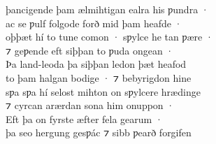 \documentclass[10pt]{book}
\begin{document}
\begin{center}
{þancigende þam \ae{}lmihtigan ealra his ƿundra · \\
ac se ƿulf folgode forð mid þam heafde · \\
oþþ\ae{}t h\'i to tune comon · sƿylce he tan ƿ\ae{}re · \\
⁊ geƿende eft siþþan to ƿuda ongean · \\
Þa land-leoda þa siþþan ledon þ\ae{}t heafod \\
to þam halgan bodige · ⁊ bebyrigdon hine \\
sƿa sƿa h\'i selost mihton on sƿylcere hr\ae{}dinge \\
⁊ cyrcan ar\ae{}rdan sona him onuppon · \\
Eft þa on fyrste \ae{}fter fela gearum · \\
þa seo hergung gesƿ\'ac ⁊ sibb ƿearð forgifen \\
}
\end{center}


\settowidth{}
\end{document}
